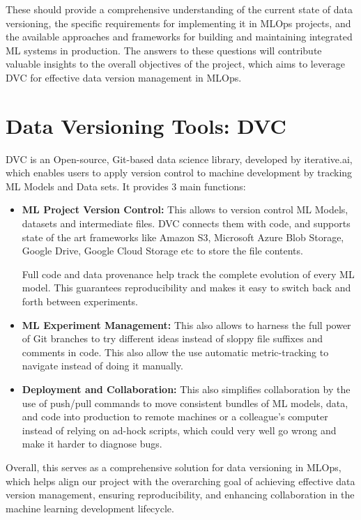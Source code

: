 \documentclass[12pt]{article}
\begin{document}
These should provide a comprehensive understanding of the current state of data versioning, the specific requirements for implementing it in MLOps projects, and the available approaches and frameworks for building and maintaining integrated ML systems in production. The answers to these questions will contribute valuable insights to the overall objectives of the project, which aims to leverage DVC for effective data version management in MLOps.

\newpage

\section{Data Versioning Tools: DVC}

DVC is an Open-source, Git-based data science library, developed by iterative.ai, which enables users to apply version control to machine development by tracking ML Models and Data sets. It provides $3$ main functions:

\begin{itemize}
    \item \textbf{ML Project Version Control:} This allows to version control ML Models, datasets and intermediate files. DVC connects them with code, and supports state of the art frameworks like Amazon S3, Microsoft Azure Blob Storage, Google Drive, Google Cloud Storage etc to store the file contents.

    Full code and data provenance help track the complete evolution of every ML model. This guarantees reproducibility and makes it easy to switch back and forth between experiments.

    \item \textbf{ML Experiment Management:} This also allows to harness the full power of Git branches to try different ideas instead of sloppy file suffixes and comments in code. This also allow the use automatic metric-tracking to navigate instead of doing it manually.
    
    \item \textbf{Deployment and Collaboration:} This also simplifies collaboration by the use of push/pull commands to move consistent bundles of ML models, data, and code into production to remote machines or a colleague's computer instead of relying on ad-hock scripts, which could very well go wrong and make it harder to diagnose bugs.
\end{itemize}

Overall, this serves as a comprehensive solution for data versioning in MLOps, which helps align our project with the overarching goal of achieving effective data version management, ensuring reproducibility, and enhancing collaboration in the machine learning development lifecycle.
\end{document}
